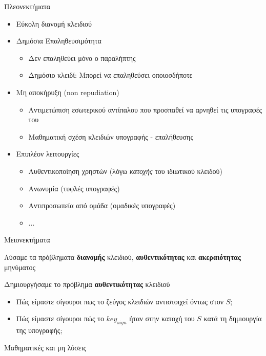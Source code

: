 \documentclass[handout]{beamer}
\begin{document}
\begin{frame}{Πλεονεκτήματα}
 
\begin{itemize}
\item Εύκολη διανομή κλειδιού
\pause
\item Δημόσια Επαληθευσιμότητα
\begin{itemize}
\item Δεν επαληθεύει μόνο ο παραλήπτης
\item Δημόσιο κλειδί: Μπορεί να επαληθεύσει οποιοσδήποτε
\end{itemize}
\pause
\item Μη αποκήρυξη (non repudiation)
\begin{itemize}
\item Αντιμετώπιση εσωτερικού αντίπαλου που προσπαθεί να αρνηθεί τις υπογραφές του
\item Μαθηματική σχέση κλειδιών υπογραφής - επαλήθευσης
\end{itemize}
\pause
\item Επιπλέον λειτουργίες
\begin{itemize}
    \item Αυθεντικοποίηση χρηστών (λόγω \emph{κατοχής} του ιδιωτικού κλειδού)
    \pause
    \item Ανωνυμία (τυφλές υπογραφές)
    \pause
    \item Αντιπροσωπεία από ομάδα (ομαδικές υπογραφές)
    \item ...
\end{itemize}
\end{itemize}
\end{frame}

\begin{frame}{Μειονεκτήματα}

Λύσαμε τα πρόβληματα \textbf{διανομής} κλειδιού, \textbf{αυθεντικότητας} και \textbf{ακεραιότητας} μηνύματος

Δημιουργήσαμε το πρόβλημα \textbf{αυθεντικότητας} κλειδιού

\begin{itemize}
\item \alert{Πώς είμαστε σίγουροι πως το ζεύγος κλειδιών αντιστοιχεί όντως στον $S$;}
\pause
\item \alert{Πώς είμαστε σίγουροι πώς το $key_{sign}$ ήταν στην κατοχή του $S$ κατά τη δημιουργία της υπογραφής;}
\end{itemize}
 
\pause Μαθηματικές και μη λύσεις
\end{frame}
\end{document}
